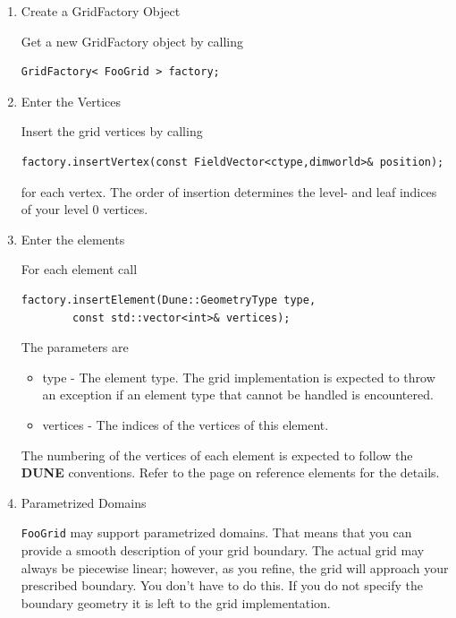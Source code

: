 \documentclass[11pt,a4paper,headinclude,footinclude,DIV16,headings=normal]{scrreprt}
\newcommand{\Dune}{{\sffamily\bfseries DUNE}\xspace}
\begin{document}
\begin{enumerate}
\item Create a GridFactory Object

Get a new GridFactory object by calling

\begin{lstlisting}[basicstyle=\small]
    GridFactory< FooGrid > factory;
\end{lstlisting}

\item Enter the Vertices

Insert the grid vertices by calling

\begin{lstlisting}[basicstyle=\small]
    factory.insertVertex(const FieldVector<ctype,dimworld>& position);
\end{lstlisting}

for each vertex. The order of insertion determines the level- and leaf indices of your level 0 vertices.

\item Enter the elements

For each element call

\begin{lstlisting}[basicstyle=\small]
    factory.insertElement(Dune::GeometryType type,
        const std::vector<int>& vertices);
\end{lstlisting}

The parameters are

\begin{itemize}
    \item type - The element type. The grid implementation is expected to throw
	an exception if an element type that cannot be handled is encountered.
    \item vertices - The indices of the vertices of this element.
\end{itemize}

The numbering of the vertices of each element is expected to follow the \Dune
conventions. Refer to the page on reference elements for the details.

\item Parametrized Domains

\lstinline!FooGrid! may support parametrized domains. That means that you can provide a smooth description of your grid boundary. The actual grid may always be piecewise linear; however, as you refine, the grid will approach your prescribed boundary. You don't have to do this. If you do not specify the boundary geometry it is left to the grid implementation.


\end{enumerate}
\end{document}
